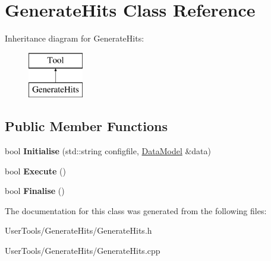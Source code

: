 \hypertarget{classGenerateHits}{\section{Generate\-Hits Class Reference}
\label{classGenerateHits}
}
Inheritance diagram for Generate\-Hits\-:\begin{figure}[H]
\begin{center}
\leavevmode
\includegraphics[height=2.000000cm]{classGenerateHits}
\end{center}
\end{figure}
\subsection*{Public Member Functions}
\begin{DoxyCompactItemize}
\item 
\hypertarget{classGenerateHits_a11c98b7819edf56f56d1981b72ed9e24}{bool {\bfseries Initialise} (std\-::string configfile, \hyperlink{classDataModel}{Data\-Model} \&data)}\label{classGenerateHits_a11c98b7819edf56f56d1981b72ed9e24}

\item 
\hypertarget{classGenerateHits_a3bf8e799c8fd096b2b3e802693fc043d}{bool {\bfseries Execute} ()}\label{classGenerateHits_a3bf8e799c8fd096b2b3e802693fc043d}

\item 
\hypertarget{classGenerateHits_a2c84756b951a63d38a6601a61334895d}{bool {\bfseries Finalise} ()}\label{classGenerateHits_a2c84756b951a63d38a6601a61334895d}

\end{DoxyCompactItemize}


The documentation for this class was generated from the following files\-:\begin{DoxyCompactItemize}
\item 
User\-Tools/\-Generate\-Hits/Generate\-Hits.\-h\item 
User\-Tools/\-Generate\-Hits/Generate\-Hits.\-cpp\end{DoxyCompactItemize}
